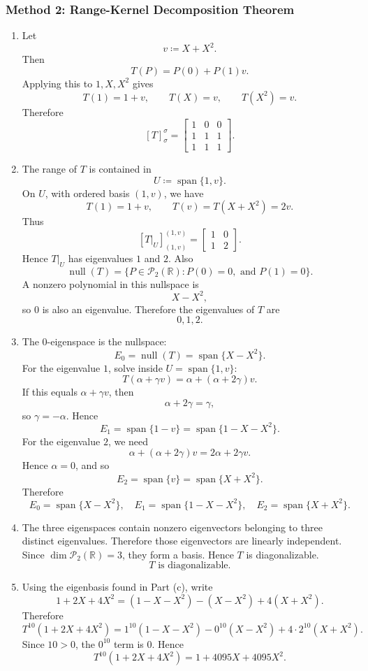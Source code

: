 \documentclass[12pt]{article}
\newcommand{\R}{\mathbb{R}}
\newcommand{\cP}{\mathcal{P}}
\newcommand{\df}{\coloneqq}
\newcommand{\Span}{\operatorname{span}}
\newcommand{\Null}{\operatorname{null}}
\begin{document}
\subsubsection{Method 2: Range-Kernel Decomposition Theorem}
\begin{enumerate}[label=(\alph*)]
  \item Let
  \[
    v\df X+X^2.
  \]
  Then
  \[
    T(P)=P(0)+P(1)v.
  \]
  Applying this to $1,X,X^2$ gives
  \[
    T(1)=1+v,
    \qquad
    T(X)=v,
    \qquad
    T(X^2)=v.
  \]
  Therefore
  \[
    \boxed{[T]_{\sigma}^{\sigma}
    =
    \begin{bmatrix}
      1&0&0\\
      1&1&1\\
      1&1&1
    \end{bmatrix}.}
  \]

  \item The range of $T$ is contained in
  \[
    U\df\Span\{1,v\}.
  \]
  On $U$, with ordered basis $(1,v)$, we have
  \[
    T(1)=1+v,
    \qquad
    T(v)=T(X+X^2)=2v.
  \]
  Thus
  \[
    [T|_U]_{(1,v)}^{(1,v)}
    =
    \begin{bmatrix}
      1&0\\
      1&2
    \end{bmatrix}.
  \]
  Hence $T|_U$ has eigenvalues $1$ and $2$. Also
  \[
    \Null(T)=\{P\in\cP_2(\R):P(0)=0,\text{ and }P(1)=0\}.
  \]
  A nonzero polynomial in this nullspace is
  \[
    X-X^2,
  \]
  so $0$ is also an eigenvalue. Therefore the eigenvalues of $T$ are
  \[
    \boxed{0,1,2.}
  \]

  \item The $0$-eigenspace is the nullspace:
  \[
    E_0=\Null(T)=\Span\{X-X^2\}.
  \]
  For the eigenvalue $1$, solve inside $U=\Span\{1,v\}$:
  \[
    T(\alpha+\gamma v)=\alpha+(\alpha+2\gamma)v.
  \]
  If this equals $\alpha+\gamma v$, then
  \[
    \alpha+2\gamma=\gamma,
  \]
  so $\gamma=-\alpha$. Hence
  \[
    E_1=\Span\{1-v\}=\Span\{1-X-X^2\}.
  \]
  For the eigenvalue $2$, we need
  \[
    \alpha+(\alpha+2\gamma)v=2\alpha+2\gamma v.
  \]
  Hence $\alpha=0$, and so
  \[
    E_2=\Span\{v\}=\Span\{X+X^2\}.
  \]
  Therefore
  \[
    \boxed{
    E_0=\Span\{X-X^2\},\quad
    E_1=\Span\{1-X-X^2\},\quad
    E_2=\Span\{X+X^2\}.}
  \]

  \item The three eigenspaces contain nonzero eigenvectors belonging to three distinct eigenvalues. Therefore those eigenvectors are linearly independent. Since $\dim\cP_2(\R)=3$, they form a basis. Hence $T$ is diagonalizable.
  \[
    \boxed{T\text{ is diagonalizable}.}
  \]

  \item Using the eigenbasis found in Part (c), write
  \[
    1+2X+4X^2
    =(1-X-X^2)-(X-X^2)+4(X+X^2).
  \]
  Therefore
  \[
    T^{10}(1+2X+4X^2)
    =1^{10}(1-X-X^2)-0^{10}(X-X^2)+4\cdot 2^{10}(X+X^2).
  \]
  Since $10>0$, the $0^{10}$ term is $0$. Hence
  \[
    \boxed{T^{10}(1+2X+4X^2)=1+4095X+4095X^2.}
  \]
\end{enumerate}
\end{document}
